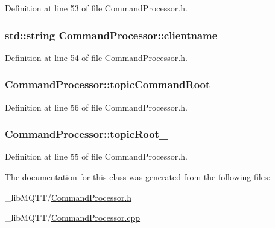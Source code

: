 Definition at line 53 of file Command\+Processor.\+h.

\subsubsection[{\texorpdfstring{clientname\+\_\+}{clientname_}}]{\setlength{\rightskip}{0pt plus 5cm}std\+::string Command\+Processor\+::clientname\+\_\+\hspace{0.3cm}{\ttfamily [protected]}}\hypertarget{class_command_processor_a3922d658643297c47765181a251b10d3}{}\label{class_command_processor_a3922d658643297c47765181a251b10d3}


Definition at line 54 of file Command\+Processor.\+h.

\subsubsection[{\texorpdfstring{topic\+Command\+Root\+\_\+}{topicCommandRoot_}}]{ Command\+Processor\+::topic\+Command\+Root\+\_\+\hspace{0.3cm}{\ttfamily [protected]}}\hypertarget{class_command_processor_ac695d4ff50c2dd91b25c8079b22170e4}{}\label{class_command_processor_ac695d4ff50c2dd91b25c8079b22170e4}


Definition at line 56 of file Command\+Processor.\+h.

\subsubsection[{\texorpdfstring{topic\+Root\+\_\+}{topicRoot_}}]{ Command\+Processor\+::topic\+Root\+\_\+\hspace{0.3cm}{\ttfamily [protected]}}\hypertarget{class_command_processor_a97f0d615c62c8c7e1712522c4577ea53}{}\label{class_command_processor_a97f0d615c62c8c7e1712522c4577ea53}


Definition at line 55 of file Command\+Processor.\+h.



The documentation for this class was generated from the following files\+:\begin{DoxyCompactItemize}
\item 
\+\_\+lib\+M\+Q\+T\+T/\hyperlink{_command_processor_8h}{Command\+Processor.\+h}\item 
\+\_\+lib\+M\+Q\+T\+T/\hyperlink{_command_processor_8cpp}{Command\+Processor.\+cpp}\end{DoxyCompactItemize}
